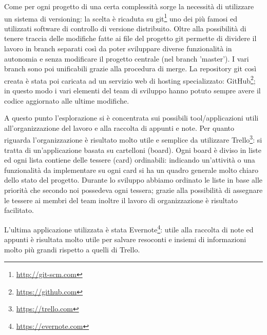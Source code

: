 \documentclass[12pt]{report}
\begin{document}
\vspace{5mm} %
 
Come per ogni progetto di una certa complessità sorge la necessità di utilizzare un sistema di versioning: la scelta è ricaduta su git\footnote{\url{http://git-scm.com}} uno dei più famosi ed utilizzati software di controllo di versione distribuito. Oltre alla possibilità di tenere traccia delle modifiche fatte ai file del progetto git permette di dividere il lavoro in branch separati così da poter sviluppare diverse funzionalità in autonomia e senza modificare il progetto centrale (nel branch 'master'). I vari branch sono poi unificabili grazie alla procedura di merge. La repository git così creata è stata poi caricata ad un servizio web di hosting specializzato: GitHub\footnote{\url{https://github.com}}; in questo modo i vari elementi del team di sviluppo hanno potuto sempre avere il codice aggiornato alle ultime modifiche.

\vspace{5mm} %

A questo punto l'esplorazione si è concentrata sui possibili tool/applicazioni utili all'organizzazione del lavoro e alla raccolta di appunti e note.
Per quanto riguarda l'organizzazione è risultato molto utile e semplice da utilizzare Trello\footnote{\url{https://trello.com}}: si tratta di un'applicazione basata su cartelloni (board). Ogni board è diviso in liste ed ogni lista contiene delle tessere (card) ordinabili: indicando un'attività o una funzionalità da implementare su ogni card si ha un quadro generale molto chiaro dello stato del progetto. Durante lo sviluppo abbiamo ordinato le liste in base alle priorità che secondo noi possedeva ogni tessera; grazie alla possibilità di assegnare le tessere ai membri del team inoltre il lavoro di organizzazione è risultato facilitato.

L'ultima applicazione utilizzata è stata Evernote\footnote{\url{https://evernote.com}}: utile alla raccolta di note ed appunti è risultata molto utile per salvare resoconti e insiemi di informazioni molto più grandi rispetto a quelli di Trello. 

\vspace{5mm} %
\end{document}
